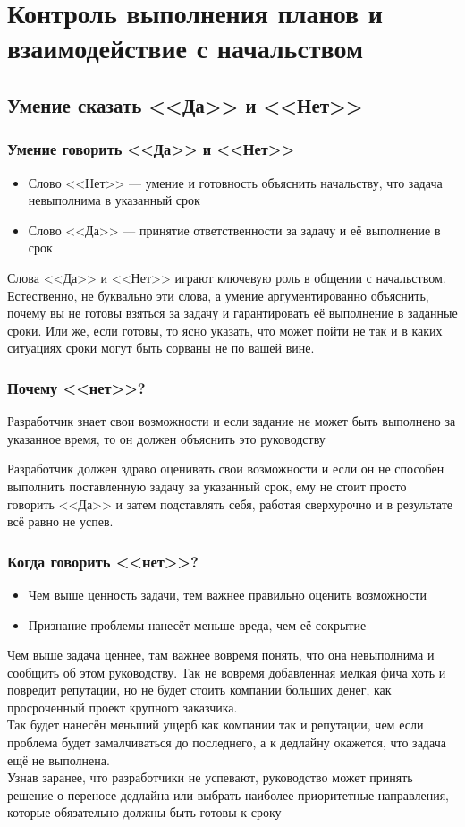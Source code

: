 \documentclass{../industrial-development}
\begin{document}
\section{Контроль выполнения планов и взаимодействие с начальством}
\subsection{Умение сказать <<Да>> и <<Нет>>}
\begin{frame} \frametitle{Умение говорить <<Да>> и <<Нет>>}
  \begin{itemize}
	\item Слово <<Нет>> --- умение и готовность объяснить начальству, что задача невыполнима в указанный срок
	\item Слово <<Да>> --- принятие ответственности за задачу и её выполнение в срок
  \end{itemize}
\end{frame}
\lecturenotes
Слова <<Да>> и <<Нет>> играют ключевую роль в общении с начальством. Естественно, не буквально эти слова, а умение аргументированно объяснить, почему вы не готовы взяться за задачу и гарантировать её выполнение в заданные сроки. Или же, если готовы, то ясно указать, что может пойти не так и в каких ситуациях сроки могут быть сорваны не по вашей вине.

\begin{frame} \frametitle{Почему <<нет>>?}
  \begin{block}{}
  Разработчик знает свои возможности и если задание не может быть выполнено за указанное время, то он должен объяснить это руководству
  \end{block}
\end{frame}
\lecturenotes
Разработчик должен здраво оценивать свои возможности и если он не способен выполнить поставленную задачу за указанный срок, ему не стоит просто говорить <<Да>> и затем подставлять себя, работая сверхурочно и в результате всё равно не успев.

\begin{frame} \frametitle{Когда говорить <<нет>>?}
  \begin{itemize}
  \item Чем выше ценность задачи, тем важнее правильно оценить возможности
	\item Признание проблемы нанесёт меньше вреда, чем её сокрытие
  \end{itemize}
\end{frame}
\lecturenotes
Чем выше задача ценнее, там важнее вовремя понять, что она невыполнима и сообщить об этом руководству. Так не вовремя добавленная мелкая фича хоть и повредит репутации, но не будет стоить компании больших денег, как просроченный проект крупного заказчика.\\
Так будет нанесён меньший ущерб как компании так и репутации, чем если проблема будет замалчиваться до последнего, а к дедлайну окажется, что задача ещё не выполнена.\\
Узнав заранее, что разработчики не успевают, руководство может принять решение о переносе дедлайна или выбрать наиболее приоритетные направления, которые обязательно должны быть готовы к сроку\\
\end{document}
